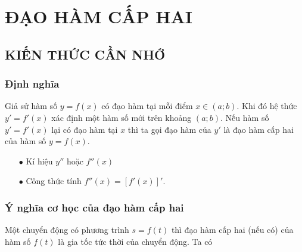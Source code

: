 \section{ĐẠO HÀM CẤP HAI}
\subsection{KIẾN THỨC CẦN NHỚ}
\subsubsection{Định nghĩa}
	Giả sử hàm số $y = f(x)$ có đạo hàm tại mỗi điểm $x \in (a; b)$. Khi đó hệ thức $y'= f'(x)$ xác định một hàm số mới trên khoảng $(a; b)$. Nếu hàm số $y' = f'(x)$ lại có đạo hàm tại $x$ thì ta gọi đạo hàm của $y'$ là đạo hàm cấp hai của hàm số $y = f(x)$.
	\begin{gachsoc}
	\begin{itemize}
		\item [$\bullet$] Kí hiệu $y''$ hoặc $f''(x)$
		\item [$\bullet$] Công thức tính $f''(x)=[f'(x)]'$.
	\end{itemize}
\end{gachsoc}
\subsubsection{Ý nghĩa cơ học của đạo hàm cấp hai}
	Một chuyển động có phương trình $s=f(t)$ thì đạo hàm cấp hai (nếu có) của hàm số $f(t)$ là gia tốc tức thời của chuyển động. Ta có 
